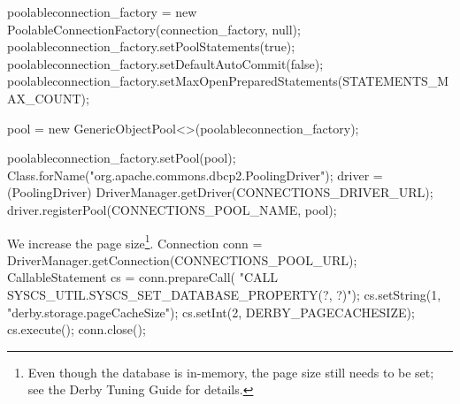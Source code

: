 \documentclass{article}
\def\nwendcode{\endtrivlist \endgroup}      %
\let\nwdocspar=\par
\theoremstyle{definition}                   %
\begin{document}
poolableconnection_factory = new PoolableConnectionFactory(connection_factory, null);
poolableconnection_factory.setPoolStatements(true);
poolableconnection_factory.setDefaultAutoCommit(false);
poolableconnection_factory.setMaxOpenPreparedStatements(STATEMENTS_MAX_COUNT);
\nwendcode{}\nwdocspar
\nwenddocs{}\endmoddef{}
pool = new GenericObjectPool<>(poolableconnection_factory);
\nwendcode{}\nwdocspar
\nwenddocs{}\endmoddef{}
poolableconnection_factory.setPool(pool);
Class.forName("org.apache.commons.dbcp2.PoolingDriver");
driver = (PoolingDriver) DriverManager.getDriver(CONNECTIONS_DRIVER_URL);
driver.registerPool(CONNECTIONS_POOL_NAME, pool);
\nwendcode{}\nwdocspar
We increase the page size\footnote{Even though the database is in-memory, the
page size still needs to be set; see the Derby Tuning Guide for details.}.
\nwenddocs{}\endmoddef{}
Connection conn = DriverManager.getConnection(CONNECTIONS_POOL_URL);
CallableStatement cs = conn.prepareCall(
  "CALL SYSCS_UTIL.SYSCS_SET_DATABASE_PROPERTY(?, ?)");
cs.setString(1, "derby.storage.pageCacheSize");
cs.setInt(2, DERBY_PAGECACHESIZE);
cs.execute();
conn.close();
\nwendcode{}\nwdocspar
\end{document}
